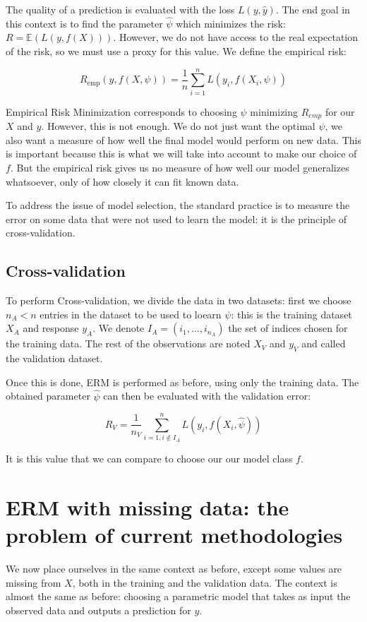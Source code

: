 \documentclass[12pt, a4paper]{memoir}
\begin{document}
The quality of a prediction is evaluated with the loss $L(y,\hat{y})$. The end goal in this context is to find the parameter $\hat{\psi}$ which minimizes the risk: $R = \mathbb{E}(L(y, f(X)))$. However, we do not have access to the real expectation of the risk, so we must use a proxy for this value. We define the empirical risk:

$$ R_{\text{emp}}(y, f(X, \psi)) = \frac{1}{n} \sum\limits_{i=1}^n L(y_i, f(X_i, \psi))$$

Empirical Risk Minimization corresponds to choosing $\psi$ minimizing $R_{emp}$ for our $X$ and $y$. However, this is not enough. We do not just want the optimal $\psi$, we also want a measure of how well the final model would perform on new data. This is important because this is what we will take into account to make our choice of $f$. But the empirical risk gives us no measure of how well our model generalizes whatsoever, only of how closely it can fit known data.

To address the issue of model selection, the standard practice is to measure the error on some data that were not used to learn the model: it is the principle of cross-validation.

		\subsection{Cross-validation}
To perform Cross-validation, we divide the data in two datasets: first we choose $n_A < n$ entries in the dataset to be used to loearn $\psi$: this is the training dataset $X_A$ and response $y_A$. We denote $I_A = (i_1, \ldots, i_{n_A})$ the set of indices chosen for the training data. The rest of the observations are noted $X_V$ and $y_V$ and called the validation dataset.

Once this is done, ERM is performed as before, using only the training data. The obtained parameter $\hat{\psi}$ can then be evaluated with the validation error:

$$ R_{V} = \frac{1}{n_V} \sum\limits_{i=1, i \notin I_A}^n L(y_i, f(X_i, \hat{\psi}))$$

It is this value that we can compare to choose our our model class $f$.

	\section{ERM with missing data: the problem of current methodologies}
We now place ourselves in the same context as before, except some values are missing from $X$, both in the training and the validation data. The context is almost the same as before: choosing a parametric model that takes as input the observed data and outputs a prediction for $y$.
\end{document}
